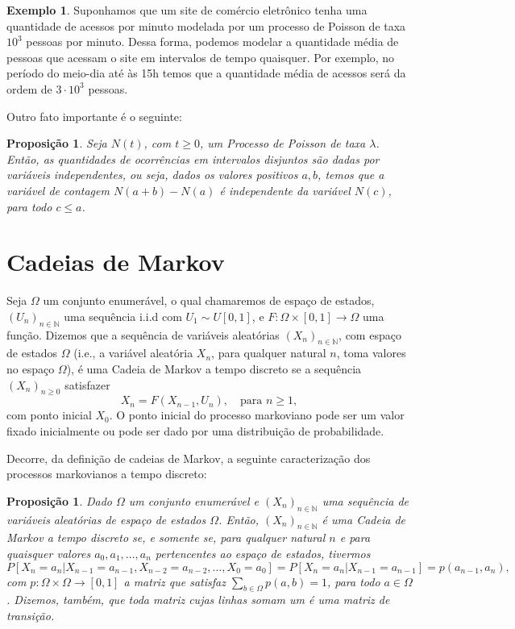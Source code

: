 \documentclass[twoside,openright,titlepage,numbers=noenddot,headinclude,  lineheaders footinclude=true,cleardoublepage=empty,
                                BCOR=5mm,paper=a4,fontsize=12pt ]{scrbook}
\newtheorem{prop}[teo]{Proposição}
\theoremstyle{definition}
\newtheorem{exmp}{Exemplo}[section]
\begin{document}
\begin{exmp} Suponhamos que um site de comércio eletrônico tenha uma quantidade de acessos
por minuto modelada por um processo de Poisson de taxa $10^3$ pessoas por minuto. Dessa forma,
podemos modelar a quantidade média de pessoas que acessam o site em intervalos de tempo
quaisquer. Por exemplo, no período do meio-dia até às 15h temos que a quantidade média
de acessos será da ordem de $3 \cdot 10^3$ pessoas.
\end{exmp}

Outro fato importante é o seguinte:
\begin{prop}
Seja $N(t)$, com $t \geq 0$, um Processo de Poisson de taxa $\lambda$. Então,
as quantidades de ocorrências em intervalos disjuntos são dadas por variáveis
independentes, ou seja, dados os valores positivos $a,b$, temos que a variável
de contagem $N(a+b) - N(a)$ é independente da variável $N(c)$, para todo $c \leq a$.
\end{prop}

\section{Cadeias de Markov}
Seja $\Omega$ um conjunto enumerável, o qual chamaremos de espaço de estados,
$(U_n)_{n \in \mathbb{N}}$ uma sequência i.i.d com $U_1 \sim U[0,1]$, e
$F: \Omega \times [0,1] \rightarrow \Omega$ uma função. Dizemos que a 
sequência de variáveis aleatórias $(X_n)_{n \in \mathbb{N}}$, com espaço de 
estados $\Omega$ (i.e., a variável aleatória $X_n$, para qualquer natural
$n$, toma valores no espaço $\Omega$), é uma Cadeia de Markov a tempo
discreto se a sequência $(X_n)_{n \geq 0}$ satisfazer
\[
X_n = F(X_{n-1}, U_n), \quad \text{para } n \geq 1,
\]
com ponto inicial $X_0$. O ponto inicial do processo markoviano pode ser um valor fixado inicialmente ou pode
ser dado por uma distribuição de probabilidade.

Decorre, da definição de cadeias de Markov, a seguinte caracterização
dos processos markovianos a tempo discreto:

\begin{prop}
Dado $\Omega$ um conjunto enumerável e $(X_n)_{n \in \mathbb{N}}$
uma sequência de variáveis aleatórias de espaço de estados $\Omega$. Então,
$(X_n)_{n \in \mathbb{N}}$ é uma Cadeia de Markov a tempo discreto se, e somente se, 
para qualquer natural $n$ e para quaisquer valores $a_0, a_1, \ldots, a_n$ 
pertencentes ao espaço de estados, tivermos
\[
P[ X_n = a_n| X_{n-1} = a_{n-1}, X_{n-2} = a_{n-2}, \ldots, X_0 = a_0] = 
P[ X_n = a_n| X_{n-1} = a_{n-1}] = p(a_{n-1}, a_{n}),
\]
com $p: \Omega \times \Omega \rightarrow [0,1]$ a matriz que satisfaz
$\sum_{b \in \Omega} p( a, b) = 1$, para todo $a \in \Omega$. Dizemos, também,
que toda matriz cujas linhas somam um é 
uma matriz de transição.
\end{prop}
\end{document}
